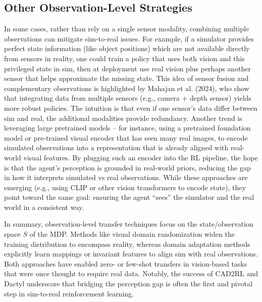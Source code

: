 \subsection{Other Observation-Level Strategies}
In some cases, rather than rely on a single sensor modality, combining multiple observations can mitigate sim-to-real issues. For example, if a simulator provides perfect state information (like object positions) which are not available directly from sensors in reality, one could train a policy that uses both vision and this privileged state in sim, then at deployment use real vision plus perhaps another sensor that helps approximate the missing state. This idea of sensor fusion and complementary observations is highlighted by Mahajan et al. (2024), who show that integrating data from multiple sensors (e.g., camera + depth sensor) yields more robust policies. The intuition is that even if one sensor’s data differ between sim and real, the additional modalities provide redundancy. Another trend is leveraging large pretrained models – for instance, using a pretrained foundation model or pre-trained visual encoder that has seen many real images, to encode simulated observations into a representation that is already aligned with real-world visual features. By plugging such an encoder into the RL pipeline, the hope is that the agent’s perception is grounded in real-world priors, reducing the gap in how it interprets simulated vs real observations. While these approaches are emerging (e.g., using CLIP or other vision transformers to encode state), they point toward the same goal: ensuring the agent “sees” the simulator and the real world in a consistent way.

In summary, observation-level transfer techniques focus on the state/observation space $S$ of the MDP. Methods like visual domain randomization widen the training distribution to encompass reality, whereas domain adaptation methods explicitly learn mappings or invariant features to align sim with real observations. Both approaches have enabled zero- or few-shot transfers in vision-based tasks that were once thought to require real data. Notably, the success of CAD2RL and Dactyl underscore that bridging the perception gap is often the first and pivotal step in sim-to-real reinforcement learning.